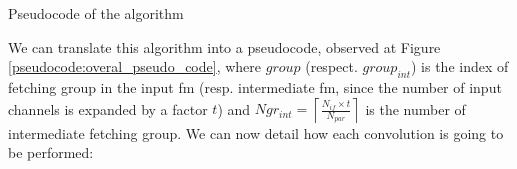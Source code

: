 \begin{algorithm}[H]
    \centering
    \begin{algorithmic}
        \EndFor
    \end{algorithmic}
    \caption{Pseudocode of the algorithm}
    \label{pseudocode:overal_pseudo_code}
\end{algorithm}
%
We can translate this algorithm into a pseudocode, observed at Figure \ref{pseudocode:overal_pseudo_code}, where $group$ (respect. $group_{int}$) is the index of fetching group in the input \acrshort{fm} (resp. intermediate \acrshort{fm}, since the number of input channels is expanded by a factor $t$) and $Ngr_{int} = \left\lceil \frac{N_{if} \times t}{N_{par}} \right\rceil$ is the number of intermediate fetching group. We can now detail how each convolution is going to be performed:
%
%
